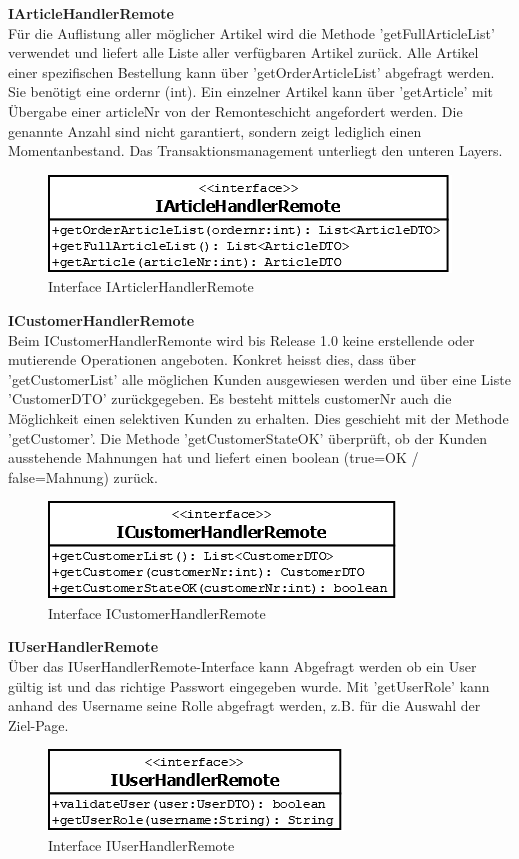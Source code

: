 \textbf{IArticleHandlerRemote}\\
Für die Auflistung aller möglicher Artikel wird die Methode 'getFullArticleList' verwendet und liefert alle Liste aller verfügbaren Artikel zurück. Alle Artikel einer spezifischen Bestellung kann über 'getOrderArticleList' abgefragt werden. Sie benötigt eine ordernr (int). Ein einzelner Artikel kann über 'getArticle' mit Übergabe einer articleNr von der Remonteschicht angefordert werden. Die genannte Anzahl sind nicht garantiert, sondern zeigt lediglich einen Momentanbestand. Das Transaktionsmanagement unterliegt den unteren Layers.
\begin{figure}[H]
	\includegraphics[width=0.6\linewidth]{Images/IArticleHandlerRemote}
	\caption{Interface IArticlerHandlerRemote}
	\label{fig:if-IArticleHandlerRemote}
\end{figure}

\textbf{ICustomerHandlerRemote}\\
Beim ICustomerHandlerRemonte wird bis Release 1.0 keine erstellende oder mutierende Operationen angeboten. Konkret heisst dies, dass über 'getCustomerList' alle möglichen Kunden ausgewiesen werden und über eine Liste 'CustomerDTO' zurückgegeben. Es besteht mittels customerNr auch die Möglichkeit einen selektiven Kunden zu erhalten. Dies geschieht mit der Methode 'getCustomer'.
Die Methode 'getCustomerStateOK' überprüft, ob der Kunden ausstehende Mahnungen hat und liefert einen boolean (true=OK / false=Mahnung) zurück.
\begin{figure}[H]
	\includegraphics[width=0.4\linewidth]{Images/ICustomerHandlerRemote}
	\caption{Interface ICustomerHandlerRemote}
	\label{fig:if-ICustomerHandlerRemote}
\end{figure}

\textbf{IUserHandlerRemote}\\
Über das IUserHandlerRemote-Interface kann Abgefragt werden ob ein User gültig ist und das richtige Passwort eingegeben wurde. Mit 'getUserRole' kann anhand des Username seine Rolle abgefragt werden, z.B. für die Auswahl der Ziel-Page. 
\begin{figure}[H]
	\includegraphics[width=0.4\linewidth]{Images/IUserHandlerRemote}
	\caption{Interface IUserHandlerRemote}
	\label{fig:if-IUserHandlerRemote}
\end{figure}


